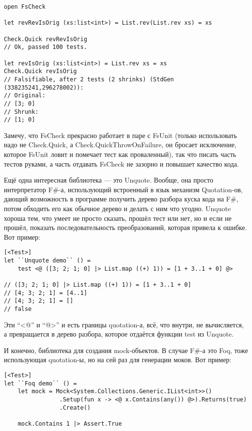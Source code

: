 \documentclass[a5paper]{article}
\begin{document}
\begin{verbatim}
open FsCheck

let revRevIsOrig (xs:list<int>) = List.rev(List.rev xs) = xs

Check.Quick revRevIsOrig
// Ok, passed 100 tests.

let revIsOrig (xs:list<int>) = List.rev xs = xs
Check.Quick revIsOrig
// Falsifiable, after 2 tests (2 shrinks) (StdGen (338235241,296278002)):
// Original:
// [3; 0]
// Shrunk:
// [1; 0]
\end{verbatim}

Замечу, что FsCheck прекрасно работает в паре с FsUnit (только использовать надо не Check.Quick, а Check.QuickThrowOnFailure, он бросает исключение, которое FsUnit ловит и помечает тест как проваленный), так что писать часть тестов руками, а часть отдавать FsCheck не зазорно и повышает качество кода.

Ещё одна интересная библиотека --- это Unquote. Вообще, она просто интерпретатор F\#-а, использующий встроенный в язык механизм Quotation-ов, дающий возможность в программе получить дерево разбора куска кода на F\#, потом обходить его как обычное дерево и делать с ним что угодно. Unquote хороша тем, что умеет не просто сказать, прошёл тест или нет, но и если не прошёл, показать последовательность преобразований, которая привела к ошибке. Вот пример:

\begin{verbatim}
[<Test>]
let ``Unquote demo`` () =
    test <@ ([3; 2; 1; 0] |> List.map ((+) 1)) = [1 + 3..1 + 0] @>

// ([3; 2; 1; 0] |> List.map ((+) 1)) = [1 + 3..1 + 0]
// [4; 3; 2; 1] = [4..1]
// [4; 3; 2; 1] = []
// false
\end{verbatim}

Эти ``<@'' и ``@>'' и есть границы quotation-а, всё, что внутри, не вычисляется, а превращается в дерево разбора, которое отдаётся функции test из Unquote.

И конечно, библиотека для создания mock-объектов. В случае F\#-а это Foq, тоже использующая quotation-ы, но на сей раз для генерации моков. Вот пример:

\begin{verbatim}
[<Test>]
let ``Foq demo`` () =
    let mock = Mock<System.Collections.Generic.IList<int>>()
                .Setup(fun x -> <@ x.Contains(any()) @>).Returns(true)
                .Create()

    mock.Contains 1 |> Assert.True
\end{verbatim}
\end{document}
